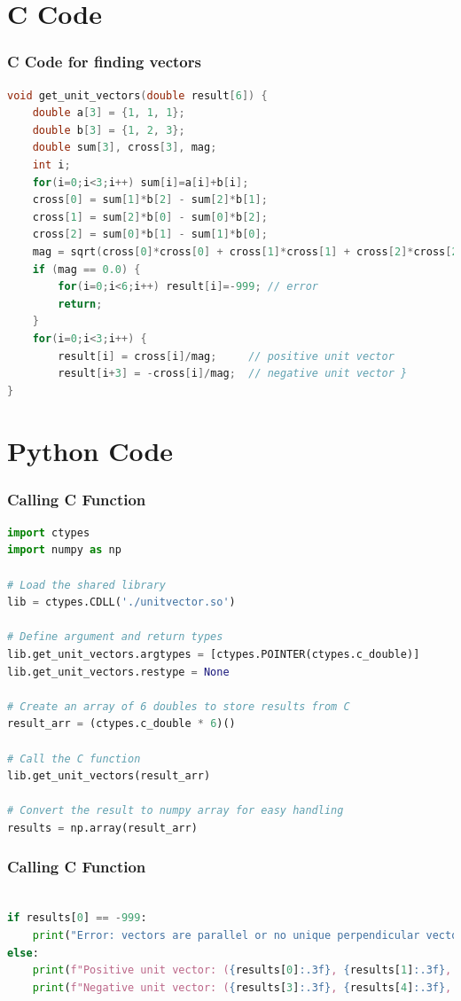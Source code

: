 \documentclass{beamer}
\theoremstyle{remark}
\numberwithin{equation}{section}
\begin{document}
\section{C Code}
\begin{frame}[fragile]
\frametitle{C Code for finding vectors}
\begin{lstlisting}[language=C]
void get_unit_vectors(double result[6]) {
    double a[3] = {1, 1, 1};
    double b[3] = {1, 2, 3};
    double sum[3], cross[3], mag;
    int i;
    for(i=0;i<3;i++) sum[i]=a[i]+b[i];
    cross[0] = sum[1]*b[2] - sum[2]*b[1];
    cross[1] = sum[2]*b[0] - sum[0]*b[2];
    cross[2] = sum[0]*b[1] - sum[1]*b[0];
    mag = sqrt(cross[0]*cross[0] + cross[1]*cross[1] + cross[2]*cross[2]);
    if (mag == 0.0) {
        for(i=0;i<6;i++) result[i]=-999; // error
        return;
    }
    for(i=0;i<3;i++) {
        result[i] = cross[i]/mag;     // positive unit vector
        result[i+3] = -cross[i]/mag;  // negative unit vector }   
}
    \end{lstlisting}
\end{frame}
\section{Python Code}
\begin{frame}[fragile]
\frametitle{Calling C Function}
\begin{lstlisting}[language=Python]
import ctypes
import numpy as np

# Load the shared library
lib = ctypes.CDLL('./unitvector.so')

# Define argument and return types
lib.get_unit_vectors.argtypes = [ctypes.POINTER(ctypes.c_double)]
lib.get_unit_vectors.restype = None

# Create an array of 6 doubles to store results from C
result_arr = (ctypes.c_double * 6)()

# Call the C function
lib.get_unit_vectors(result_arr)

# Convert the result to numpy array for easy handling
results = np.array(result_arr)
\end{lstlisting}
\end{frame}

\begin{frame}[fragile]
\frametitle{Calling C Function}
\begin{lstlisting}[language=Python]

if results[0] == -999:
    print("Error: vectors are parallel or no unique perpendicular vector.")
else:
    print(f"Positive unit vector: ({results[0]:.3f}, {results[1]:.3f}, {results[2]:.3f})")
    print(f"Negative unit vector: ({results[3]:.3f}, {results[4]:.3f}, {results[5]:.3f})")

\end{lstlisting}
\end{frame}
\end{document}
